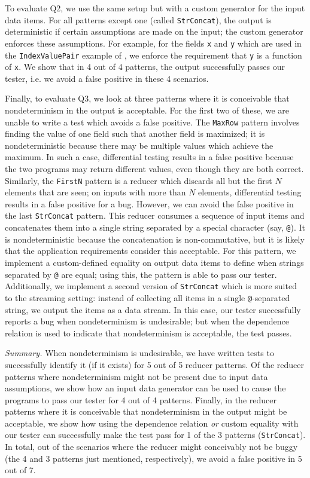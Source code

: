 To evaluate Q2, we use the same setup but with a custom generator for the input data items.
For all patterns except one (called \texttt{StrConcat}), the output is deterministic if certain assumptions are made on the input;
the custom generator enforces these assumptions. For example, for the fields \texttt{x} and \texttt{y} which are used in the \texttt{IndexValuePair} example of , we enforce the requirement that \texttt{y} is a function of \texttt{x}.
We show that in 4 out of 4 patterns, the output successfully passes our tester, i.e. we avoid a false positive in these 4 scenarios.

Finally, to evaluate Q3, we look at three patterns where it is conceivable that nondeterminism in the output is acceptable.
For the first two of these, we are unable to write a test which avoids a false positive.
The \texttt{MaxRow} pattern involves finding the value of one field such that another field is maximized; it is nondeterministic because there may be multiple values which achieve the maximum. In such a case, differential testing results in a false positive because the two programs may return different values, even though they are both correct. Similarly, the \texttt{FirstN} pattern is a reducer which discards all but the first $N$ elements that are seen; on inputs with more than $N$ elements, differential testing results in a false positive for a bug.
However, we can avoid the false positive in the last \texttt{StrConcat} pattern. This reducer consumes a sequence of input items and concatenates them into a single string separated by a special character (say, \texttt{@}). It is nondeterministic because the concatenation is non-commutative, but it is likely that the application requirements consider this acceptable. For this pattern, we implement a custom-defined equality on output data items to define when strings separated by \texttt{@} are equal; using this, the pattern is able to pass our tester.
Additionally, we implement a second version of \texttt{StrConcat} which is more suited to the streaming setting: instead of collecting all items in a single \texttt{@}-separated string, we output the items as a data stream. In this case, our tester successfully reports a bug when nondeterminism is undesirable; but when the dependence relation is used to indicate that nondeterminism is acceptable, the test passes.

\emph{Summary.}
When nondeterminism is undesirable, we have written tests to successfully identify it (if it exists) for 5 out of 5 reducer patterns. Of the reducer patterns where nondeterminism might not be present due to input data assumptions, we show how an input data generator can be used to cause the programs to pass our tester for 4 out of 4 patterns. Finally, in the reducer patterns where it is conceivable that nondeterminism in the output might be acceptable, we show how using the dependence relation \emph{or} custom equality with our tester can successfully make the test pass for 1 of the 3 patterns (\texttt{StrConcat}). In total, out of the scenarios where the reducer might conceivably not be buggy (the 4 and 3 patterns just mentioned, respectively), we avoid a false positive in 5 out of 7.

